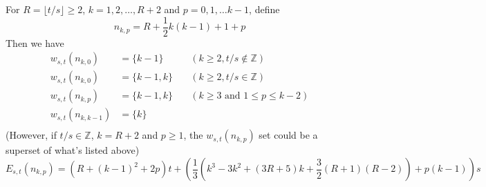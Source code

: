 \documentclass[]{article}
\begin{document}
\vspace{1cm}
\begin{lemma}[Mode $M_1$]  For $R = \lfloor t/s\rfloor \geq 2$, $k = 1,2,\dots,R + 2$ and  $p = 0, 1, \dots k - 1$, define
	\[
		n_{k,p} = R + \frac{1}{2}k(k-1) + 1 + p
	\]
	Then we have
	\begin{align*}
	    w_{s,t}(n_{k, 0}) &= \{k-1\} &\quad(k\geq 2, t/s\notin\mathbb{Z})\\
	    w_{s,t}(n_{k, 0}) &= \{k-1, k\} &\quad(k\geq 2, t/s\in\mathbb{Z})\\
	    w_{s,t}(n_{k, p}) &= \{k-1, k\}&\quad (k\geq 3 \text{ and } 1 \leq p\leq k-2)\\
	    w_{s,t}(n_{k, k-1}) &= \{k\}\\
	\end{align*}
	(However, if $t/s\in\mathbb{Z}$, $k=R+2$ and $p \geq 1$, the $w_{s,t}(n_{k, p})$ set could be a superset of what's listed above)
	\[
	E_{s,t}(n_{k, p}) = \left(R+(k-1)^2+2p\right)t + \left( \frac{1}{3}(k^3-3k^2+(3R+5)k+\frac{3}{2}(R+1)(R-2)) + p(k-1) \right) s
	\]
\end{lemma}
\end{document}
